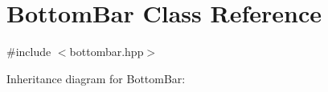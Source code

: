 \hypertarget{classBottomBar}{}\section{Bottom\+Bar Class Reference}
\label{classBottomBar}


{\ttfamily \#include $<$bottombar.\+hpp$>$}



Inheritance diagram for Bottom\+Bar\+:

